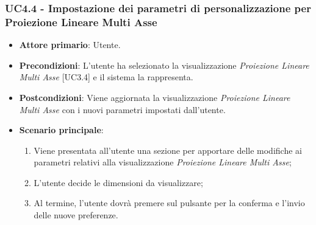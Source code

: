 \subsubsection{UC4.4 - Impostazione dei parametri di personalizzazione per Proiezione Lineare Multi Asse}
\begin{itemize}
	\item \textbf{Attore primario}: Utente.
	\item \textbf{Precondizioni}: L'utente ha selezionato la visualizzazione \textit{Proiezione Lineare Multi Asse} [UC3.4] e il sistema la rappresenta.
	\item \textbf{Postcondizioni}: Viene aggiornata la visualizzazione \textit{Proiezione Lineare Multi Asse} con i nuovi parametri impostati dall'utente.
	\item \textbf{Scenario principale}:
	\begin{enumerate}
			\item Viene presentata all'utente una sezione per apportare delle modifiche ai parametri relativi alla visualizzazione \textit{Proiezione Lineare Multi Asse};
			\item L'utente decide le dimensioni da visualizzare;
			\item Al termine, l'utente dovrà premere sul pulsante per la conferma e l'invio delle nuove preferenze.
		\end{enumerate}
\end{itemize}